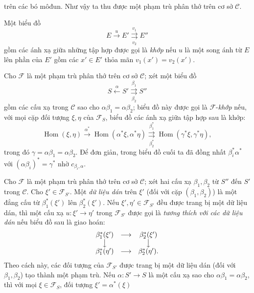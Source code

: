 trên các bó môđun. Như vậy ta thu được một phạm trù phân thớ trên cơ sở
$\mathcal C$.

 Một biểu đồ
\[
  E\xrightarrow{u}E'
  \overset{v_1}{\underset{v_2}{\rightrightarrows}}E''
\]
gồm các ánh xạ giữa những tập hợp được gọi là \emph{khớp} nếu $u$ là một song
ánh từ $E$ lên phần của $E'$ gồm các $x'\in E'$ thỏa mãn
$v_1(x')=v_2(x')$.

 Cho $\mathcal F$ là một phạm trù phân thớ trên cơ sở
$\mathcal C$; xét một biểu đồ
\[
  \tag{+}
  S\xleftarrow{\alpha}S'
  \overset{\beta_1}{\underset{\beta_2}{\rightrightarrows}}S''
\]
gồm các cấu xạ trong $\mathcal C$ sao cho
$\alpha\beta_1=\alpha\beta_2$; biểu đồ này được gọi là
$\mathcal F$-\emph{khớp} nếu, với mọi cặp đối tượng $\xi,\eta$ của
$\mathcal F_S$, biểu đồ các ánh xạ giữa tập hợp sau là khớp:
\[
  \tag{+'}
  \operatorname{Hom}(\xi,\eta)
  \xrightarrow{\alpha^*}
  \operatorname{Hom}(\alpha^*\xi,\alpha^*\eta)
  \overset{\beta_1^*}{\underset{\beta_2^*}{\rightrightarrows}}
  \operatorname{Hom}(\gamma^*\xi,\gamma^*\eta),
\]
trong đó $\gamma=\alpha\beta_1=\alpha\beta_2$. Để đơn giản, trong biểu đồ cuối
ta đã đồng nhất $\beta_i^*\alpha^*$ với
$(\alpha\beta_i)^*=\gamma^*$ nhờ $c_{\beta_i,\alpha}$.

 Cho $\mathcal F$ là một phạm trù phân thớ trên cơ sở
$\mathcal C$; xét hai cấu xạ $\beta_1,\beta_2$ từ $S''$ đến $S'$ trong
$\mathcal C$. Cho $\xi'\in\mathcal F_{S'}$. Một \emph{dữ liệu dán} trên
$\xi'$ (đối với cặp $(\beta_1,\beta_2)$) là một đẳng cấu từ
$\beta_1^*(\xi')$ lên $\beta_2^*(\xi')$. Nếu
$\xi',\eta'\in\mathcal F_{S'}$ đều được trang bị một dữ liệu dán, thì một cấu
xạ $u:\xi'\longrightarrow\eta'$ trong $\mathcal F_{S'}$ được gọi là
\emph{tương thích với các dữ liệu dán} nếu biểu đồ sau là giao hoán:
\[
\begin{array}{ccc}
  \beta_1^*(\xi') & \longrightarrow & \beta_2^*(\xi') \\
  \big\downarrow && \big\downarrow \\
  \beta_1^*(\eta') & \longrightarrow & \beta_2^*(\eta').
\end{array}
\]
Theo cách này, các đối tượng của $\mathcal F_{S'}$ được trang bị một dữ liệu
dán (đối với $\beta_1,\beta_2$) tạo thành một phạm trù. Nếu
$\alpha:S'\longrightarrow S$ là một cấu xạ sao cho
$\alpha\beta_1=\alpha\beta_2$, thì với mọi $\xi\in\mathcal F_S$, đối tượng
$\xi'=\alpha^*(\xi)$

